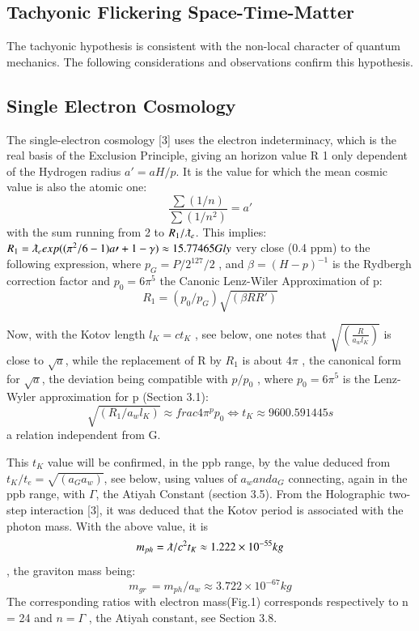 \documentclass[twoside,draft]{article}
\begin{document}
\begin{sloppypar}
{\subsection{Tachyonic Flickering Space-Time-Matter}

The tachyonic hypothesis is consistent with the non-local character of quantum mechanics. The
following considerations and observations confirm this hypothesis.

\subsection{Single Electron Cosmology}

The single-electron cosmology [3] uses the electron indeterminacy, which is the real basis of the
Exclusion Principle, giving an horizon value R 1 only dependent of the Hydrogen radius $a\prime = aH/p$. It
is the value for which the mean cosmic value is also the atomic one:
\begin{equation}
\frac{\sum(1/n)}{\sum(1/n^{2})} = a\prime
\end{equation}
with the sum running from 2 to $R_{1} /\lambdabar_{e}$. This implies:
$R_{1} = \lambdabar_{e} exp((\pi^{2} /6 - 1)a\prime + 1 - \gamma) \approx 15.77465 Gly$
very close (0.4 ppm) to the following expression, where $p_{G} = P/2^{127}/2$ , and $\beta = (H - p)^{-1}$ is the
Rydbergh correction factor and $p_{0} = 6\pi^{5}$ the Canonic Lenz-Wiler Approximation of p:
\begin{equation}
R_{1} = ( p_{0} /p_{G} ) \sqrt{(\beta R R\prime)}
\end{equation}

Now, with the Kotov length $l_{K} = ct_{K}$ , see below, one notes that $\sqrt{(\frac{R}{a_{w} l_{K}})}$ is close to $\sqrt{a}$, while
the replacement of R by $R_{1}$ is about $4\pi$ , the canonical form for $\sqrt{a}$, the deviation being compatible
with $p/p_{0}$ , where $p_{0} = 6\pi^{5}$ is the Lenz-Wyler approximation for p (Section 3.1):
$$\sqrt{(R_{1} /a_{w} l_{K})} \approx frac{4\pi^{p}}{p_{0}} \Leftrightarrow t_{K} \approx 9 600.591445 s$$ a relation independent from G. 

This $t_K$ value will be confirmed, in the ppb range, by the value
deduced from $t_{K} /t_{e} = \sqrt{(a_{G} a_{w})}$, see below, using values of $a_{w} and a_{G}$ connecting, again in the ppb
range, with $\Gamma$, the Atiyah Constant (section 3.5).
From the Holographic two-step interaction [3], it was deduced that the Kotov period is
associated with the photon mass. With the above value, it is $$m_{ph} = \lambdabar/c^{2} t_{K} \approx 1.222 \times 10^{-55} kg$$, the
graviton mass being: 
\begin{equation}
m_{gr}\, = m_{ph} /a_{w} \approx 3.722 \times 10^{-67} kg
\end{equation} 
The corresponding ratios with electron mass(Fig.1) corresponds respectively to n = 24 and $n = \Gamma$ , the Atiyah constant, see Section 3.8.

}
\end{sloppypar}
\end{document}
